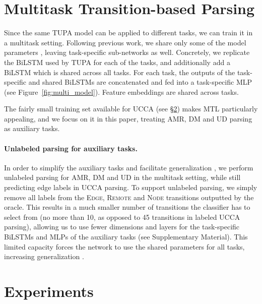 \documentclass[11pt,a4paper]{article}
\begin{document}
\section{Multitask Transition-based Parsing}\label{sec:multitask}

Since the same TUPA model can be applied to different tasks, 
we can train it in a multitask setting.
Following previous work, we share only some of the model parameters
\cite{N16-1179,P16-2038,C16-1013,C16-1059,C16-1179,E17-1005,P17-1186}, leaving task-specific
sub-networks as well.
Concretely, we replicate the BiLSTM used by TUPA for each of the tasks, and additionally add
a BiLSTM which is shared across all tasks. 
For each task, the outputs of the task-specific and shared BiLSTMs are concatenated and
fed into a task-specific MLP (see Figure~\ref{fig:multi_model}).
Feature embeddings are shared across tasks.

The fairly small training set available for UCCA (see \S\ref{sec:experiments})
makes MTL particularly appealing,
and we focus on it in this paper, treating AMR, DM and UD parsing as auxiliary tasks.

\paragraph{Unlabeled parsing for auxiliary tasks.}
In order to simplify the auxiliary tasks and facilitate generalization \cite{E17-2026,E17-1005},
we perform unlabeled parsing for AMR, DM and UD in the multitask setting,
while still predicting edge labels in UCCA parsing.
To support unlabeled parsing, we simply remove all labels from the
\textsc{Edge}, \textsc{Remote} and \textsc{Node} transitions outputted by the oracle.
This results in a much smaller number of transitions the classifier has to select from
(no more than 10, as opposed to 45 transitions in labeled UCCA parsing),
allowing us to use fewer dimensions and layers for the task-specific BiLSTMs and MLPs
of the auxiliary tasks (see Supplementary Material).
This limited capacity forces the network to use the shared parameters for all tasks,
increasing generalization \cite{E17-1005}.



\section{Experiments}\label{sec:experiments}
\end{document}
